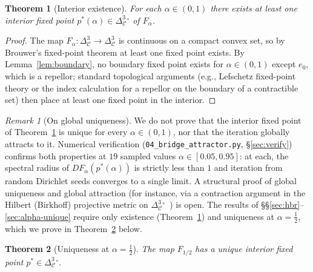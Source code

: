 \documentclass[11pt,reqno]{amsart}
\theoremstyle{plain}
\newtheorem{theorem}{Theorem}
\theoremstyle{definition}
\theoremstyle{remark}
\newtheorem*{remark}{Remark}
\newcommand{\Cfour}{\mathcal{C}}
\begin{document}
\begin{theorem}[Interior existence]\label{thm:attractor}
For each $\alpha\in(0,1)$ there exists at least one interior
fixed point $p^*(\alpha)\in\Delta^{3}_{\Cfour}^{\circ}$ of
$F_{\alpha}$.
\end{theorem}

\begin{proof}
The map $F_{\alpha}: \Delta^{3}_{\Cfour}\to\Delta^{3}_{\Cfour}$
is continuous on a compact convex set, so by Brouwer's fixed-point
theorem at least one fixed point exists. By Lemma~\ref{lem:boundary},
no boundary fixed point exists for $\alpha\in(0, 1)$ except
$e_{0}$, which is a repellor; standard topological arguments
(e.g., Lefschetz fixed-point theory or the index calculation for
a repellor on the boundary of a contractible set) then place at
least one fixed point in the interior.
\end{proof}

\begin{remark}[On global uniqueness]\label{rem:uniqueness}
We do not prove that the interior fixed point of
Theorem~\ref{thm:attractor} is unique for every
$\alpha\in(0, 1)$, nor that the iteration globally attracts to
it. Numerical verification
(\texttt{04\_bridge\_attractor.py}, \S\ref{sec:verify}) confirms
both properties at $19$ sampled values
$\alpha\in[0.05, 0.95]$: at each, the spectral radius of
$DF_{\alpha}(p^*(\alpha))$ is strictly less than $1$ and
iteration from random Dirichlet seeds converges to a single
limit. A structural proof of global uniqueness and global
attraction (for instance, via a contraction argument in the
Hilbert (Birkhoff) projective metric on
$\Delta^{3}_{\Cfour}^{\circ}$~\cite{Birkhoff1957, Bushell1973})
is open. The
results of \S\S\ref{sec:hbr}--\ref{sec:alpha-unique} require only
existence (Theorem~\ref{thm:attractor}) and uniqueness at
$\alpha = \tfrac12$, which we prove in
Theorem~\ref{thm:attractor-half} below.
\end{remark}

\begin{theorem}[Uniqueness at $\alpha = \tfrac12$]\label{thm:attractor-half}
The map $F_{1/2}$ has a unique interior fixed point
$p^*\in\Delta^{3}_{\Cfour}^{\circ}$.
\end{theorem}
\end{document}
